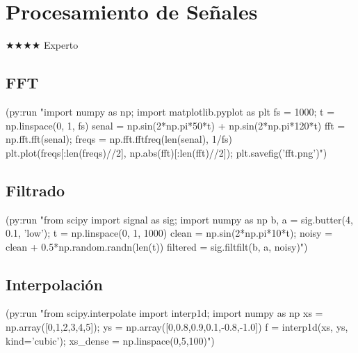 \chapter{Procesamiento de Señales}
\label{chap:signal-processing}
{\huge$\bigstar$}{\huge$\bigstar$}{\huge$\bigstar$}{\huge$\bigstar$} Experto

\section{FFT}
\begin{lispcode}
(py:run "import numpy as np; import matplotlib.pyplot as plt
fs = 1000; t = np.linspace(0, 1, fs)
senal = np.sin(2*np.pi*50*t) + np.sin(2*np.pi*120*t)
fft = np.fft.fft(senal); freqs = np.fft.fftfreq(len(senal), 1/fs)
plt.plot(freqs[:len(freqs)//2], np.abs(fft)[:len(fft)//2]); plt.savefig('fft.png')")
\end{lispcode}

\section{Filtrado}
\begin{lispcode}
(py:run "from scipy import signal as sig; import numpy as np
b, a = sig.butter(4, 0.1, 'low'); t = np.linspace(0, 1, 1000)
clean = np.sin(2*np.pi*10*t); noisy = clean + 0.5*np.random.randn(len(t))
filtered = sig.filtfilt(b, a, noisy)")
\end{lispcode}

\section{Interpolación}
\begin{lispcode}
(py:run "from scipy.interpolate import interp1d; import numpy as np
xs = np.array([0,1,2,3,4,5]); ys = np.array([0,0.8,0.9,0.1,-0.8,-1.0])
f = interp1d(xs, ys, kind='cubic'); xs_dense = np.linspace(0,5,100)")
\end{lispcode}


